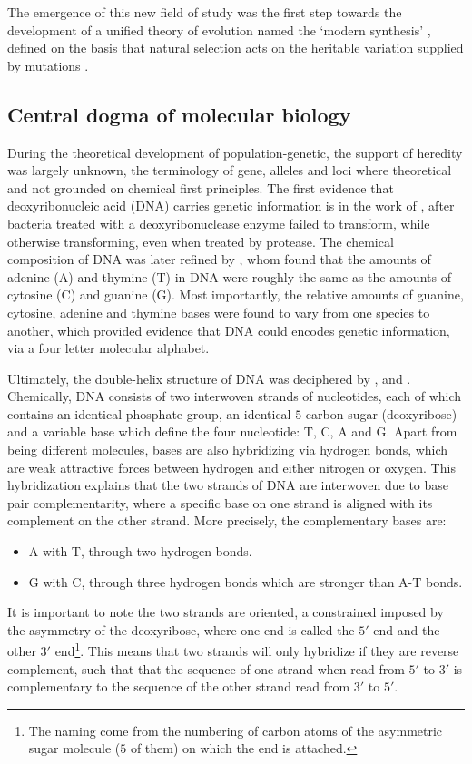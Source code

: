 The emergence of this new field of study was the first step towards the development of a unified theory of evolution named the ‘modern synthesis’ \citep{huxley1942evolution}, defined on the basis that natural selection acts on the heritable variation supplied by mutations \citep{mayr1959where,stebbins1966processes,dobzhansky1974chance}.

\subsection{Central dogma of molecular biology}
During the theoretical development of population-genetic, the support of heredity was largely unknown, the terminology of gene, \glspl{allele} and loci where theoretical and not grounded on chemical first principles.
The first evidence that deoxyribonucleic acid (\acrshort{DNA}) carries genetic information is in the work of \citet{Avery1944}, after bacteria treated with a deoxyribonuclease enzyme failed to transform, while otherwise transforming, even when treated by protease.
The chemical composition of \acrshort{DNA} was later refined by \citet{Chargaff1950}, whom found that the amounts of adenine (A) and thymine (T) in \acrshort{DNA} were roughly the same as the amounts of cytosine (C) and guanine (G).
Most importantly, the relative amounts of guanine, cytosine, adenine and thymine bases were found to vary from one species to another, which provided evidence that \acrshort{DNA} could encodes genetic information, via a four letter molecular alphabet.

Ultimately, the double-helix structure of \acrshort{DNA} was deciphered by \citet{franklin1953molecular}, \citet{watson1953molecular} and \citet{wilkins1953molecular}.
Chemically, \acrshort{DNA} consists of two interwoven strands of nucleotides, each of which contains an identical phosphate group, an identical $5$-carbon sugar (deoxyribose) and a variable base which define the four nucleotide: T, C, A and G.
Apart from being different molecules, bases are also hybridizing via hydrogen bonds, which are weak attractive forces between hydrogen and either nitrogen or oxygen.
This hybridization explains that the two strands of \acrshort{DNA} are interwoven due to base pair complementarity, where a specific base on one strand is aligned with its complement on the other strand.
More precisely, the complementary bases are:
\begin{itemize}
	\item A with T, through two hydrogen bonds.
	\item G with C, through three hydrogen bonds which are stronger than A-T bonds. 
\end{itemize}
It is important to note the two strands are oriented, a constrained imposed by the asymmetry of the deoxyribose, where one end is called the $5'$ end and the other $3'$ end\footnote{The naming come from the numbering of carbon atoms of the asymmetric sugar molecule ($5$ of them) on which the end is attached.}. 
This means that two strands will only hybridize if they are reverse complement, such that that the sequence of one strand when read from $5'$ to $3'$ is complementary to the sequence of the other strand read from $3'$ to $5'$.

